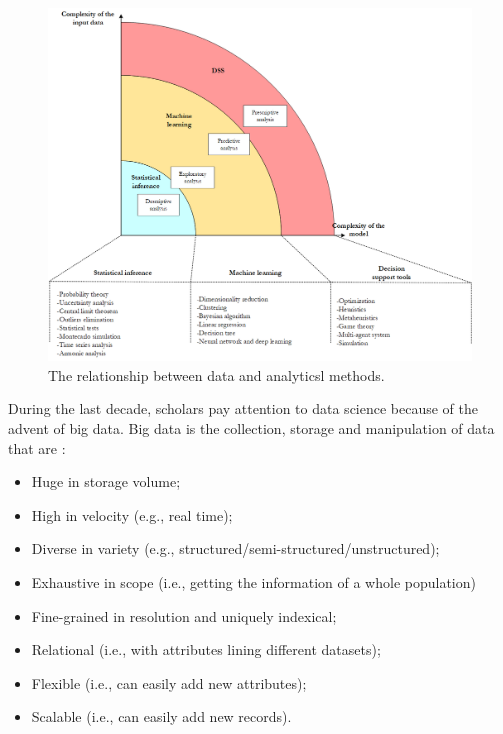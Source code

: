\begin{figure}[hbt!]
\centering
\includegraphics[width=1\textwidth]{SectionIntroduction/introduction_figures/fig_methods.png}
\captionsetup{type=figure}
\caption{The relationship between data and analyticsl methods.}
\label{fig_methods}
\end{figure}

During the last decade, scholars pay attention to data science because of the advent of big data. Big data is the collection, storage and manipulation of data that are \cite{Kitchin2014}:

\begin{itemize}
    \item Huge in storage volume;
    \item High in velocity (e.g., real time);
    \item Diverse in variety (e.g., structured/semi-structured/unstructured);
    \item Exhaustive in scope (i.e., getting the information of a whole population)
    \item Fine-grained in resolution and uniquely indexical;
    \item Relational (i.e., with attributes lining different datasets);
    \item Flexible (i.e., can easily add new attributes);
    \item Scalable (i.e., can easily add new records).

\end{itemize}

